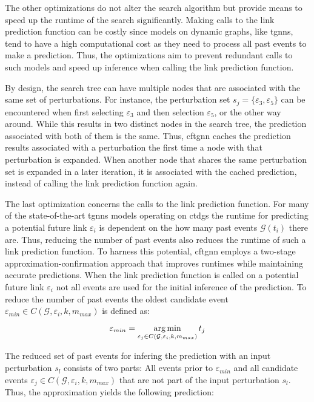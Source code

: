  The other optimizations do not alter the search algorithm but provide means to speed up the runtime of the search significantly. Making calls to the link prediction function can be costly since models on dynamic graphs, like \glspl{tgnn}, tend to have a high computational cost as they need to process all past events to make a prediction. Thus, the optimizations aim to prevent redundant calls to such models and speed up inference when calling the link prediction function.

By design, the search tree can have multiple nodes that are associated with the same set of perturbations. For instance, the perturbation set $s_j = \{\varepsilon_3, \varepsilon_5\}$ can be encountered when first selecting $\varepsilon_3$ and then selection $\varepsilon_5$, or the other way around. While this results in two distinct nodes in the search tree, the prediction associated with both of them is the same. Thus, \gls{cftgnn} caches the prediction results associated with a perturbation the first time a node with that perturbation is expanded. When another node that shares the same perturbation set is expanded in a later iteration, it is associated with the cached prediction, instead of calling the link prediction function again.

The last optimization concerns the calls to the link prediction function. For many of the state-of-the-art \glspl{tgnn} models operating on \glspl{ctdg} \cite{rossi_temporal_2020, souza_provably_2022} the runtime for predicting a potential future link $\varepsilon_i$ is dependent on the how many past events $\mathcal{G}(t_i)$ there are. Thus, reducing the number of past events also reduces the runtime of such a link prediction function. To harness this potential, \gls{cftgnn} employs a two-stage approximation-confirmation approach that improves runtimes while maintaining accurate predictions. When the link prediction function is called on a potential future link $\varepsilon_i$ not all events are used for the initial inference of the prediction. To reduce the number of past events the oldest candidate event $\varepsilon_{min} \in C(\mathcal{G}, \varepsilon_i, k, m_{max})$ is defined as:

\begin{equation}
    \varepsilon_{min} = \operatorname*{arg\,min}_{\varepsilon_j \in C(\mathcal{G}, \varepsilon_i, k, m_{max})} t_j
\end{equation}

The reduced set of past events for infering the prediction with an input perturbation $s_l$ consists of two parts: All events prior to $\varepsilon_{min}$ and all candidate events $\varepsilon_j \in C(\mathcal{G}, \varepsilon_i, k, m_{max})$ that are not part of the input perturbation $s_l$. Thus, the approximation yields the following prediction:

